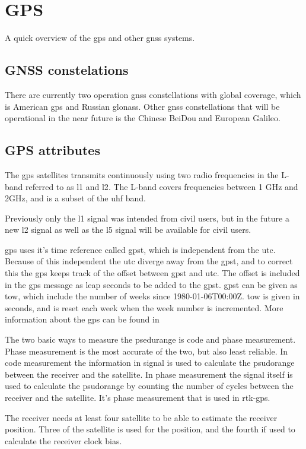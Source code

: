 \section{GPS}
A quick overview of the gps and other gnss systems.
\subsection{GNSS constelations}
There are currently two operation \gls{gnss} constellations with global coverage, which is American \gls{gps} and Russian \gls{glonass}. Other \gls{gnss} constellations that will be operational in the near future is the Chinese BeiDou and European Galileo.
\subsection{GPS attributes}
The \gls{gps} satellites transmits continuously using two radio frequencies in the L-band referred to as \gls{l1} and {l2}. The L-band covers frequencies between 1 GHz and 2GHz, and is a subset of the \gls{uhf} band.

Previously only the \gls{l1} signal was intended from civil users, but in the future a new {l2} signal as well as the \gls{l5} signal will be available for civil users. 

\gls{gps} uses it's time reference called \gls{gpst}, which is independent from the \gls{utc}. Because of this independent the \gls{utc} diverge away from the \gls{gpst}, and to correct this the \gls{gps} keeps track of the offset between \gls{gpst} and \gls{utc}. The offset is included in the \gls{gps} message as leap seconds to be added to the \gls{gpst}. \gls{gpst} can be given as \gls{tow}, which include the number of weeks since 1980-01-06T00:00Z. \gls{tow} is given in seconds, and is reset each week when the week number is incremented. More information about the \gls{gps} can be found in \citep{GPSBOOK,vik2014integrated} 

The two basic ways to measure the psedurange is code and phase measurement. Phase measurement is the most accurate of the two, but also least reliable.
In code measurement the information in signal is used to calculate the psudorange between the receiver and the satellite. In phase measurement the signal itself is used to calculate the psudorange by counting the number of cycles between the receiver and the satellite. It's phase measurement that is used in \gls{rtk-gps}.

The receiver needs at least four satellite to be able to estimate the receiver position. Three of the satellite is used for the position, and the fourth if used to calculate the receiver clock bias. 
 
